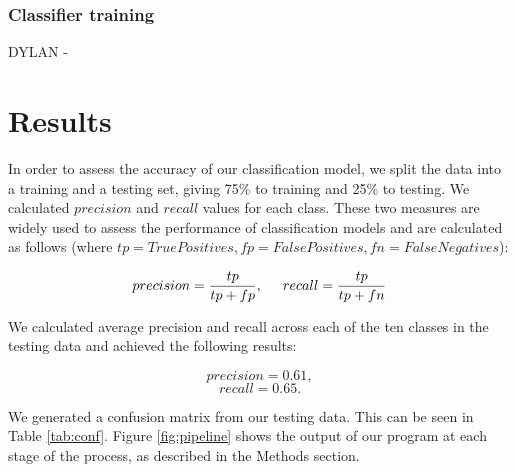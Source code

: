 \documentclass[12pt]{article}
\begin{document}
\subsubsection{Classifier training}

DYLAN - 


\section{Results}

In order to assess the accuracy of our classification model, we split the data into a training and a testing set, giving 75\% to training and 25\% to testing. We calculated $precision$ and $recall$ values for each class. These two measures are widely used to assess the performance of classification models and are calculated as follows (where $tp=TruePositives,fp=FalsePositives,fn=FalseNegatives$):

\[precision=\frac{tp}{tp+fp},\hspace{5mm}recall=\frac{tp}{tp+fn}\]

We calculated average precision and recall across each of the ten classes in the testing data and achieved the following results: 

\[precision=0.61,\]
\[recall=0.65.\]

We generated a confusion matrix from our testing data. This can be seen in Table \ref{tab:conf}. Figure \ref{fig:pipeline} shows the output of our program at each stage of the process, as described in the Methods section.
\end{document}
